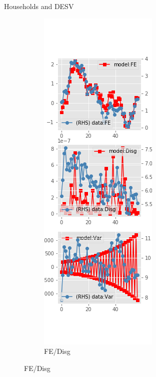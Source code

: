 \documentclass{beamer}
\begin{document}
\begin{frame}{Households and DESV}
\begin{figure}[ht]
\begin{subfigure}[b]{0.2\textwidth}
		\end{subfigure}
		\hfill
		\begin{subfigure}[b]{0.2\textwidth}
			\caption{FE/Disg}
			\includegraphics[width=\textwidth, height = 0.8\textheight]{figuresDraft/sce_de_est_sv_diag2.png}
		\end{subfigure}
	\end{figure}
\end{frame}
\end{document}
